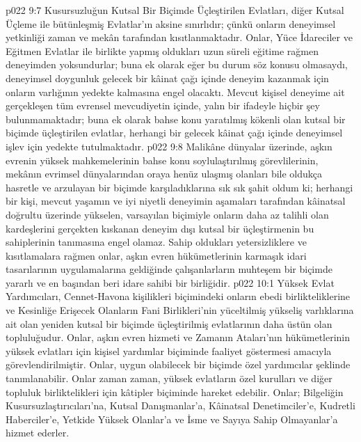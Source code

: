 \vs p022 9:7 Kusursuzluğun Kutsal Bir Biçimde Üçleştirilen Evlatları, diğer Kutsal Üçleme ile bütünleşmiş Evlatlar’ın aksine sınırlıdır; çünkü onların deneyimsel yetkinliği zaman ve mekân tarafından kısıtlanmaktadır. Onlar, Yüce İdareciler ve Eğitmen Evlatlar ile birlikte yapmış oldukları uzun süreli eğitime rağmen deneyimden yoksundurlar; buna ek olarak eğer bu durum söz konusu olmasaydı, deneyimsel doygunluk gelecek bir kâinat çağı içinde deneyim kazanmak için onların varlığının yedekte kalmasına engel olacaktı. Mevcut kişisel deneyime ait gerçekleşen tüm evrensel mevcudiyetin içinde, yalın bir ifadeyle hiçbir şey bulunmamaktadır; buna ek olarak bahse konu yaratılmış kökenli olan kutsal bir biçimde üçleştirilen evlatlar, herhangi bir gelecek kâinat çağı içinde deneyimsel işlev için yedekte tutulmaktadır.
\vs p022 9:8 Malikâne dünyalar üzerinde, aşkın evrenin yüksek mahkemelerinin bahse konu soylulaştırılmış görevlilerinin, mekânın evrimsel dünyalarından oraya henüz ulaşmış olanları bile oldukça hasretle ve arzulayan bir biçimde karşıladıklarına sık sık şahit oldum ki; herhangi bir kişi, mevcut yaşamın ve iyi niyetli deneyimin aşamaları tarafından kâinatsal doğrultu üzerinde yükselen, varsayılan biçimiyle onların daha az talihli olan kardeşlerini gerçekten kıskanan deneyim dışı kutsal bir üçleştirmenin bu sahiplerinin tanımasına engel olamaz. Sahip oldukları yetersizliklere ve kısıtlamalara rağmen onlar, aşkın evren hükümetlerinin karmaşık idari tasarılarının uygulamalarına geldiğinde çalışanlarların muhteşem bir biçimde yararlı ve en başından beri idare sahibi bir birliğidir.
\vs p022 10:1 Yüksek Evlat Yardımcıları, Cennet\hyp{}Havona kişilikleri biçimindeki onların ebedi birlikteliklerine ve Kesinliğe Erişecek Olanların Fani Birlikleri’nin yüceltilmiş yükseliş varlıklarına ait olan yeniden kutsal bir biçimde üçleştirilmiş evlatlarının daha üstün olan topluluğudur. Onlar, aşkın evren hizmeti ve Zamanın Ataları’nın hükümetlerinin yüksek evlatları için kişisel yardımlar biçiminde faaliyet göstermesi amacıyla görevlendirilmiştir. Onlar, uygun olabilecek bir biçimde özel yardımcılar şeklinde tanımlanabilir. Onlar zaman zaman, yüksek evlatların özel kurulları ve diğer topluluk birliktelikleri için kâtipler biçiminde hareket edebilir. Onlar; Bilgeliğin Kusursuzlaştırıcıları’na, Kutsal Danışmanlar’a, Kâinatsal Denetimciler’e, Kudretli Haberciler’e, Yetkide Yüksek Olanlar’a ve İsme ve Sayıya Sahip Olmayanlar’a hizmet ederler.
